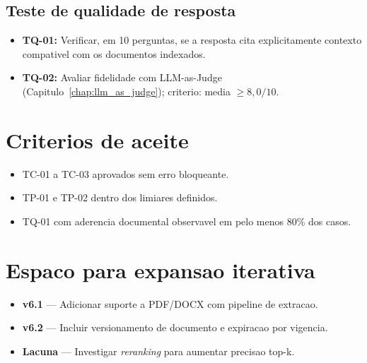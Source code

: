 \subsection{Teste de qualidade de resposta}

\begin{itemize}[leftmargin=*]
  \item \textbf{TQ-01:} Verificar, em 10 perguntas, se a resposta cita
        explicitamente contexto compativel com os documentos indexados.
  \item \textbf{TQ-02:} Avaliar fidelidade com LLM-as-Judge (Capitulo~\ref{chap:llm_as_judge});
        criterio: media $\geq 8{,}0/10$.
\end{itemize}

\section{Criterios de aceite}

\begin{itemize}[leftmargin=*]
  \item TC-01 a TC-03 aprovados sem erro bloqueante.
  \item TP-01 e TP-02 dentro dos limiares definidos.
  \item TQ-01 com aderencia documental observavel em pelo menos 80\% dos casos.
\end{itemize}

\section{Espaco para expansao iterativa}

\begin{itemize}[leftmargin=*]
  \item \textbf{v6.1} --- Adicionar suporte a PDF/DOCX com pipeline de extracao.
  \item \textbf{v6.2} --- Incluir versionamento de documento e expiracao por vigencia.
  \item \textbf{Lacuna} --- Investigar \textit{reranking} para aumentar precisao top-k.
\end{itemize}
